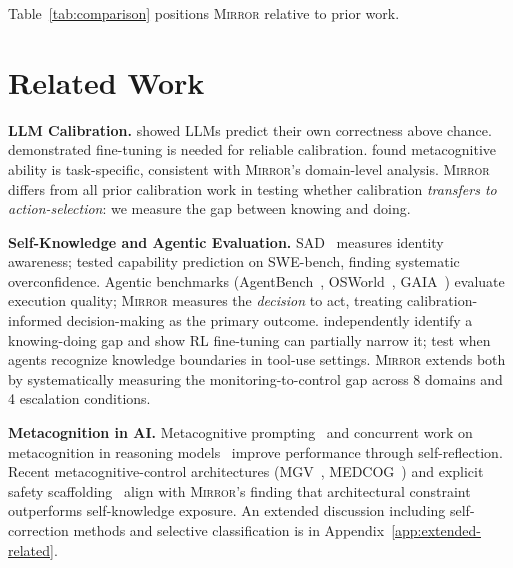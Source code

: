 \documentclass[10pt]{article}
\newcommand{\mirror}{\textsc{Mirror}}
\begin{document}
Table~\ref{tab:comparison} positions \mirror{} relative to prior work.



\section{Related Work}
\label{sec:related}

\textbf{LLM Calibration.}
\citet{kadavath2022language} showed LLMs predict their own correctness above chance. \citet{kapoor2024calibration} demonstrated fine-tuning is needed for reliable calibration. \citet{steyvers2025calibration} found metacognitive ability is task-specific, consistent with \mirror{}'s domain-level analysis. \mirror{} differs from all prior calibration work in testing whether calibration \textit{transfers to action-selection}: we measure the gap between knowing and doing.

\textbf{Self-Knowledge and Agentic Evaluation.}
SAD~\citep{laine2024me} measures identity awareness; \citet{barkan2025llms} tested capability prediction on SWE-bench, finding systematic overconfidence. Agentic benchmarks (AgentBench~\citep{liu2023agentbench}, OSWorld~\citep{xie2024osworld}, GAIA~\citep{mialon2023gaia}) evaluate execution quality; \mirror{} measures the \textit{decision} to act, treating calibration-informed decision-making as the primary outcome.
\citet{schmied2026greedy} independently identify a knowing-doing gap and show RL fine-tuning can partially narrow it; \citet{qiao2025agentic} test when agents recognize knowledge boundaries in tool-use settings. \mirror{} extends both by systematically measuring the monitoring-to-control gap across 8 domains and 4 escalation conditions.

\textbf{Metacognition in AI.}
Metacognitive prompting~\citep{wang2024metacognitive} and concurrent work on metacognition in reasoning models~\citep{metacog2026} improve performance through self-reflection. Recent metacognitive-control architectures (MGV~\citep{oh2025mgv}, MEDCOG~\citep{zhao2026medcog}) and explicit safety scaffolding~\citep{mosaic2026} align with \mirror{}'s finding that architectural constraint outperforms self-knowledge exposure. An extended discussion including self-correction methods and selective classification is in Appendix~\ref{app:extended-related}.
\end{document}
